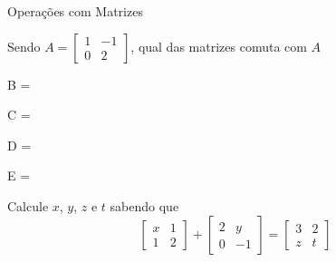 \begin{exercicios}{Operações com Matrizes}
    \begin{exercicio}
        Sendo \( A=\left[\begin{array}{rr}
                                    1 & -1 \\
                                    0 &  2
                                 \end{array}\right] \),
        qual das matrizes comuta com $A$
        \begin{mathlist}[2]
            \item B = \left[\begin{array}{r}
                    2 \\ 3
                \end{array}\right]
            \item C = 
            \item D = \left[\begin{array}{rr}
                   0 & 0 \\
                   1 & 0
                \end{array}\right]
            \item E = \left[\begin{array}{rr}
                   5 & 2 \\
                   0 & 3
                \end{array}\right]
        \end{mathlist}
    \end{exercicio}
        
    \begin{exercicio}
        Calcule $x$, $y$, $z$ e $t$ sabendo que
        \[\left[\begin{array}{cc}
        x & 1 \\
        1 & 2
        \end{array}\right] +
        \left[\begin{array}{rr}
        2 &  y \\
        0 & -1
        \end{array}\right]  = 
        \left[\begin{array}{cc}
        3 & 2 \\
        z & t
        \end{array}\right]\]
    \end{exercicio}
    

\end{exercicios}

